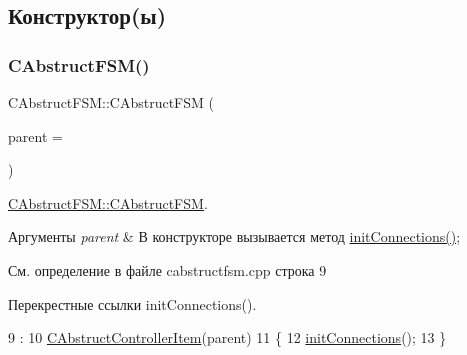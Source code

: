 \subsection{Конструктор(ы)}
\hypertarget{class_c_abstruct_f_s_m_a54037c986f6b437c50d5e8ba42063330}{}\label{class_c_abstruct_f_s_m_a54037c986f6b437c50d5e8ba42063330} 
\subsubsection{\texorpdfstring{C\+Abstruct\+F\+S\+M()}{CAbstructFSM()}}
{\footnotesize\ttfamily C\+Abstruct\+F\+S\+M\+::\+C\+Abstruct\+F\+SM (\begin{DoxyParamCaption}\item[{Q\+Object $\ast$}]{parent = {} }\end{DoxyParamCaption})\hspace{0.3cm}{\ttfamily [explicit]}}



\hyperlink{class_c_abstruct_f_s_m_a54037c986f6b437c50d5e8ba42063330}{C\+Abstruct\+F\+S\+M\+::\+C\+Abstruct\+F\+SM}. 


\begin{DoxyParams}{Аргументы}
{\em parent} & В конструкторе вызывается метод \hyperlink{class_c_abstruct_f_s_m_a9d6f4659a08f3028f8c047243f8dcfc3}{init\+Connections()}; \\
\hline
\end{DoxyParams}


См. определение в файле cabstructfsm.\+cpp строка 9



Перекрестные ссылки init\+Connections().


\begin{DoxyCode}
9                                           :
10     \hyperlink{class_c_abstruct_controller_item_a1d99654a9522cc8721a329d1dcee35a4}{CAbstructControllerItem}(parent)
11 \{
12     \hyperlink{class_c_abstruct_f_s_m_a9d6f4659a08f3028f8c047243f8dcfc3}{initConnections}();
13 \}
\end{DoxyCode}
\hypertarget{class_c_abstruct_f_s_m_acef4a425dee5b9705bc6bbff79225bae}{}\label{class_c_abstruct_f_s_m_acef4a425dee5b9705bc6bbff79225bae} 
